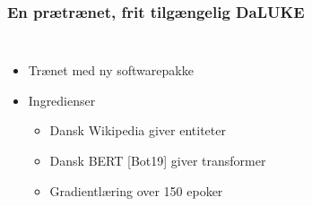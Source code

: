 \documentclass{beamer}
\begin{document}
\begin{frame}
    \frametitle{En prætrænet, frit tilgængelig DaLUKE}
    \begin{columns}
        \begin{itemize}
            \item Trænet med ny softwarepakke
            \item Ingredienser
                \begin{itemize}
                    \item Dansk Wikipedia giver entiteter
                    \item Dansk BERT [Bot19] giver transformer
                    \item Gradientlæring over 150 epoker
                \end{itemize}
        \end{itemize}

        \begin{figure}[H]
            \centering
            
        \end{figure}\noindent
        \begin{example}
            \footnotesize
            \begin{overlayarea}{\textwidth}{1cm}
            \end{overlayarea}
        \end{example}
    \end{columns}
\end{frame}
\end{document}
